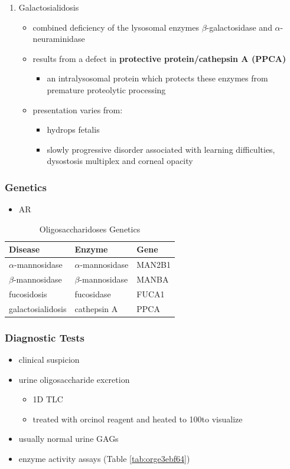 \documentclass[12pt]{scrartcl}
\begin{document}
\begin{enumerate}
\item Galactosialidosis
\label{sec:orgb32b609}
\begin{itemize}
\item combined deficiency of the lysosomal enzymes \(\beta\)-galactosidase and
\(\alpha\)-neuraminidase
\item results from a defect in \textbf{protective protein/cathepsin A (PPCA)}
\begin{itemize}
\item an intralysosomal protein which protects these enzymes from
premature proteolytic processing
\end{itemize}
\item presentation varies from:
\begin{itemize}
\item hydrops fetalis
\item slowly progressive disorder associated with learning
difficulties, dysostosis multiplex and corneal opacity
\end{itemize}
\end{itemize}
\end{enumerate}

\subsubsection{Genetics}
\label{sec:org6f0ae81}
\begin{itemize}
\item AR
\end{itemize}

\begin{table}[htbp]
\caption{\label{tab:orgca2e3e0}Oligosaccharidoses Genetics}
\centering
\begin{tabular}{lll}
Disease & Enzyme & Gene\\
\hline
\(\alpha\)-mannosidase & \(\alpha\)-mannosidase & MAN2B1\\
\(\beta\)-mannosidase & \(\beta\)-mannosidase & MANBA\\
fucosidosis & fucosidase & FUCA1\\
galactosialidosis & cathepsin A & PPCA\\
\end{tabular}
\end{table}

\subsubsection{Diagnostic Tests}
\label{sec:org4361e39}
\begin{itemize}
\item clinical suspicion
\item urine oligosaccharide excretion
\begin{itemize}
\item 1D TLC
\item treated with orcinol reagent and heated to 100\degreeC to visualize
\end{itemize}
\item usually normal urine GAGs
\item enzyme activity assays (Table \ref{tab:orge3ebf64})
\end{itemize}
\end{document}
